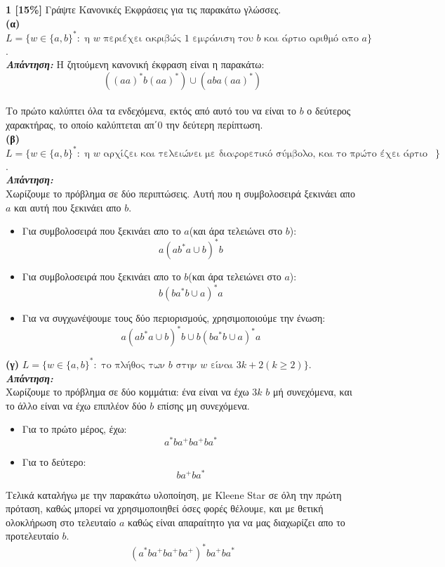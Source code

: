 \documentclass[10pt,a4paper]{article}
\newcommand{\sol}[1]{#1} %
\begin{document}
\textbf{1 [15\%]}
Γράψτε Κανονικές Εκφράσεις για τις παρακάτω γλώσσες. \\
\textbf{(α)} $L = \big\{ w \in \{a,b\}^*:\text{ η $w$ περιέχει ακριβώς 1 εμφάνιση του $b$ και άρτιο αριθμό απο $a$}\big\}$. \\
\sol{
	\hspace*{0.5cm} {\em \textbf{Απάντηση:} }
	Η ζητούμενη κανονική έκφραση είναι η παρακάτω:
	\\
	$$ ((aa)^*b(aa)^*) \cup (aba(aa)^*)  $$ \\
	Το πρώτο καλύπτει όλα τα ενδεχόμενα, εκτός από αυτό του να είναι το $b$ ο δεύτερος χαρακτήρας, το οποίο καλύπτεται απ΄0 την δεύτερη περίπτωση. \\
}
\textbf{(β)} $L = \big\{ w \in \{a,b\}^*:\text{ η $w$ αρχίζει και τελειώνει με διαφορετικό σύμβολο, και το πρώτο έχει άρτιο πλήθος.}\big\}$. \\
\sol{
	\hspace*{0.5cm} {\em \textbf{Απάντηση:} }
	\\
	Χωρίζουμε το πρόβλημα σε δύο περιπτώσεις. Αυτή που η συμβολοσειρά ξεκινάει απο $a$ και αυτή που ξεκινάει απο $b$.
	\begin{itemize}
		\item Για συμβολοσειρά που ξεκινάει απο το $a$(και άρα τελειώνει στο $b$): 
		$$ a(ab^*a \cup b)^*b  $$
		\item Για συμβολοσειρά που ξεκινάει απο το $b$(και άρα τελειώνει στο $a$): 
		$$ b(ba^*b \cup a)^*a  $$
		\item Για να συγχωνέψουμε τους δύο περιορισμούς, χρησιμοποιούμε την ένωση:
		$$ a(ab^*a \cup b)^*b \cup b(ba^*b \cup a)^*a  $$
	\end{itemize}
}
\textbf{(γ)} $L = \big\{ w \in \{a,b\}^*:\text{ το πλήθος των $b$ στην $w$ είναι } 3k+2 (k \geq 2)\big\}$. \\
\sol{
	\hspace*{0.5cm} {\em \textbf{Απάντηση:} }
	\\ 
	Χωρίζουμε το πρόβλημα σε δύο κομμάτια: ένα είναι να έχω $3k$ $b$ μή συνεχόμενα, και το άλλο είναι να έχω επιπλέον δύο $b$ επίσης μη συνεχόμενα.
	\begin{itemize}
		\item Για το πρώτο μέρος, έχω:
		$$a^*ba^+ba^+ba^*$$
		\item Για το δεύτερο:
		$$ba^+ba^*$$
	\end{itemize}
	
	Τελικά καταλήγω με την παρακάτω υλοποίηση, με \en Kleene Star \gr σε όλη την πρώτη πρόταση, καθώς μπορεί να χρησιμοποιηθεί όσες φορές θέλουμε, και με θετική ολοκλήρωση στο τελευταίο $a$ καθώς είναι απαραίτητο για να μας διαχωρίζει απο το προτελευταίο $b$.
	$$(a^*ba^+ba^+ba^+)^*ba^+ba^*$$
}
\end{document}

